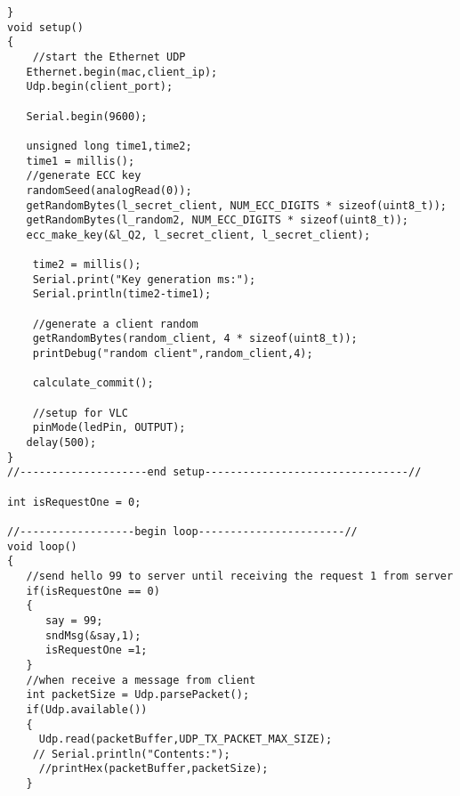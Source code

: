 {\begin{Verbatim}[fontsize=\small]
}
void setup()
{
    //start the Ethernet UDP
   Ethernet.begin(mac,client_ip);
   Udp.begin(client_port);
   
   Serial.begin(9600);
   
   unsigned long time1,time2;
   time1 = millis();
   //generate ECC key
   randomSeed(analogRead(0));
   getRandomBytes(l_secret_client, NUM_ECC_DIGITS * sizeof(uint8_t));
   getRandomBytes(l_random2, NUM_ECC_DIGITS * sizeof(uint8_t));
   ecc_make_key(&l_Q2, l_secret_client, l_secret_client);
   
    time2 = millis();
    Serial.print("Key generation ms:");
    Serial.println(time2-time1);
   
    //generate a client random 
    getRandomBytes(random_client, 4 * sizeof(uint8_t));
    printDebug("random client",random_client,4);
   
    calculate_commit();
    
    //setup for VLC
    pinMode(ledPin, OUTPUT);
   delay(500);
}
//--------------------end setup--------------------------------//

int isRequestOne = 0;

//------------------begin loop-----------------------//
void loop()
{
   //send hello 99 to server until receiving the request 1 from server
   if(isRequestOne == 0)
   {
      say = 99;
      sndMsg(&say,1);
      isRequestOne =1;
   }
   //when receive a message from client
   int packetSize = Udp.parsePacket();
   if(Udp.available())
   {
     Udp.read(packetBuffer,UDP_TX_PACKET_MAX_SIZE);
    // Serial.println("Contents:");
     //printHex(packetBuffer,packetSize);
   }
   

\end{Verbatim}}
